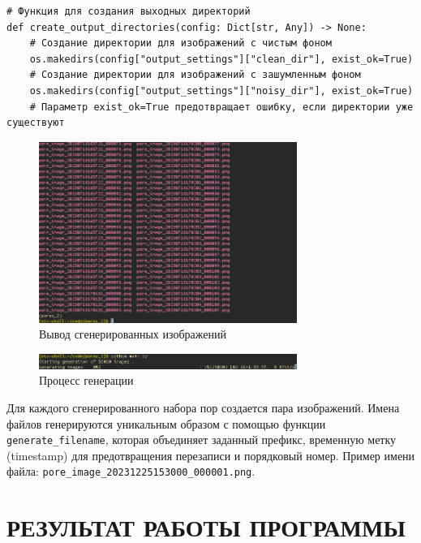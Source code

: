 \documentclass[code]{wordcore}
\begin{document}
\begin{code}
	\begin{verbatim}
# Функция для создания выходных директорий
def create_output_directories(config: Dict[str, Any]) -> None:
    # Создание директории для изображений с чистым фоном
    os.makedirs(config["output_settings"]["clean_dir"], exist_ok=True)
    # Создание директории для изображений с зашумленным фоном
    os.makedirs(config["output_settings"]["noisy_dir"], exist_ok=True)
    # Параметр exist_ok=True предотвращает ошибку, если директории уже существуют
  \end{verbatim}
\end{code}

\begin{figure}[H]
	\centering
	\includegraphics[width=0.75\textwidth]{fig/pores_output.png}
	\caption{Вывод сгенерированных изображений}
\end{figure}


\begin{figure}[H]
	\centering
	\includegraphics[width=0.75\textwidth]{fig/generate_pocessing.png}
	\caption{Процесс генерации}
\end{figure}

Для каждого сгенерированного набора пор создается пара изображений. Имена файлов генерируются уникальным образом с помощью функции \texttt{generate\-\_filename}, которая объединяет заданный префикс, временную метку (timestamp) для предотвращения перезаписи и порядковый номер. Пример имени файла: \texttt{pore\_image\_20231225153000\-\_000001.png}.

\section{РЕЗУЛЬТАТ РАБОТЫ ПРОГРАММЫ}
\end{document}

